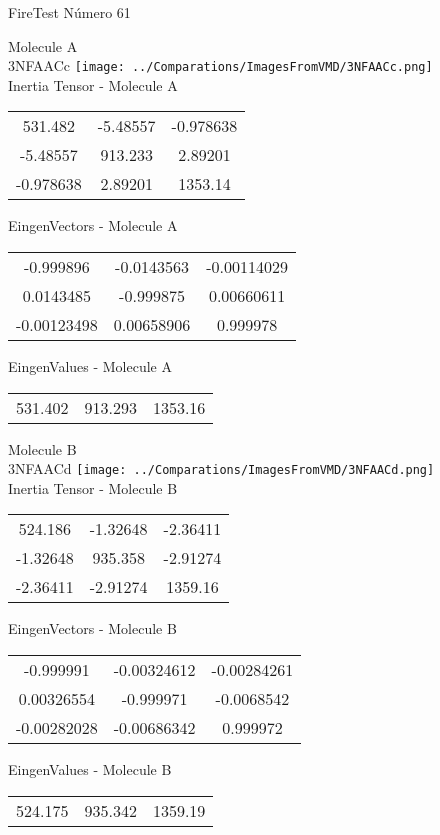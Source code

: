 \vtab[-2cm]
\begin{center}
{\large FireTest \tab Número 61}
\end{center}
\begin{multicols}{2}
\begin{center}

Molecule A \\ 
3NFAACc
\texttt{[image: ../Comparations/ImagesFromVMD/3NFAACc.png]}
\\
Inertia Tensor - Molecule A \\
\vtab

\begin{tabular}{|c c c|}
531.482	 & 	-5.48557	 & 	-0.978638	 \\
-5.48557	 & 	913.233	 & 	2.89201	 \\
-0.978638	 & 	2.89201	 & 	1353.14
\end{tabular}

\vtab
 EingenVectors - Molecule A     \\
\vtab
\begin{tabular}{|c c c|}
-0.999896	 & 	-0.0143563	 & 	-0.00114029	 \\
0.0143485	 & 	-0.999875	 & 	0.00660611	 \\
-0.00123498	 & 	0.00658906	 & 	0.999978
\end{tabular}

\vtab
 EingenValues - Molecule A     \\
\vtab
\begin{tabular}{|c c c|}
531.402	 & 	913.293	 & 	1353.16	 \\
\end{tabular}
\columnbreak

Molecule B \\ 
3NFAACd
\texttt{[image: ../Comparations/ImagesFromVMD/3NFAACd.png]}
\\
Inertia Tensor - Molecule B \\
\vtab

\begin{tabular}{|c c c|}
524.186	 & 	-1.32648	 & 	-2.36411	 \\
-1.32648	 & 	935.358	 & 	-2.91274	 \\
-2.36411	 & 	-2.91274	 & 	1359.16
\end{tabular}

\vtab
 EingenVectors - Molecule B     \\
\vtab
\begin{tabular}{|c c c|}
-0.999991	 & 	-0.00324612	 & 	-0.00284261	 \\
0.00326554	 & 	-0.999971	 & 	-0.0068542	 \\
-0.00282028	 & 	-0.00686342	 & 	0.999972
\end{tabular}

\vtab
 EingenValues - Molecule B     \\
\vtab
\begin{tabular}{|c c c|}
524.175	 & 	935.342	 & 	1359.19	 \\
\end{tabular}

\end{center}
\end{multicols}

